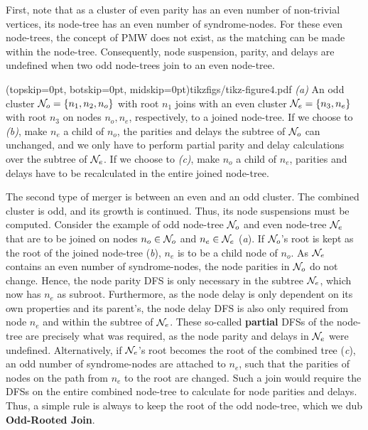 First, note that as a cluster of even parity has an even number of non-trivial vertices, its node-tree has an even number of syndrome-nodes. For these even node-trees, the concept of PMW does not exist, as the matching can be made within the node-tree. Consequently, node suspension, parity, and delays are undefined when two odd node-trees join to an even node-tree. 

\Figure[hbt](topskip=0pt, botskip=0pt, midskip=0pt){tikzfigs/tikz-figure4.pdf}{
    \emph{(a)} An odd cluster $\mathcal{N}_o=\{n_1, n_2, n_o\}$ with root $n_1$ joins with an even cluster $\mathcal{N}_e=\{n_3, n_e\}$ with root $n_3$ on nodes $n_o, n_e$, respectively, to a joined node-tree. If we choose to \emph{(b)}, make $n_e$ a child of $n_o$, the parities and delays the subtree of $\mathcal{N}_o$ can unchanged, and we only have to perform partial parity and delay calculations over the subtree of $\mathcal{N}_e$. If we choose to \emph{(c)}, make $n_o$ a child of $n_e$, parities and delays have to be recalculated in the entire joined node-tree. \label{fig4}}

The second type of merger is between an even and an odd cluster. The combined cluster is odd, and its growth is continued. Thus, its node suspensions must be computed. Consider the example of odd node-tree $\mathcal{N}_o$ and even node-tree $\mathcal{N}_e$ that are to be joined on nodes $n_o\in \mathcal{N}_o$ and $n_e \in \mathcal{N}_e$ (\emph{a}). If $\mathcal{N}_o$'s root is kept as the root of the joined node-tree (\emph{b}), $n_e$ is to be a child node of $n_o$. As $\mathcal{N}_e$ contains an even number of syndrome-nodes, the node parities in $\mathcal{N}_o$ do not change. Hence, the node parity DFS is only necessary in the subtree $\mathcal{N}_e$, which now has $n_e$ as subroot. Furthermore, as the node delay is only dependent on its own properties and its parent's, the node delay DFS is also only required from node $n_e$ and within the subtree of $\mathcal{N}_e$. These so-called \textbf{partial} DFSs of the node-tree are precisely what was required, as the node parity and delays in $\mathcal{N}_e$ were undefined. Alternatively, if $\mathcal{N}_e$'s root becomes the root of the combined tree (\emph{c}), an odd number of syndrome-nodes are attached to $n_e$, such that the parities of nodes on the path from $n_e$ to the root are changed. Such a join would require the DFSs on the entire combined node-tree to calculate for node parities and delays. Thus, a simple rule is always to keep the root of the odd node-tree, which we dub \textbf{Odd-Rooted Join}.

